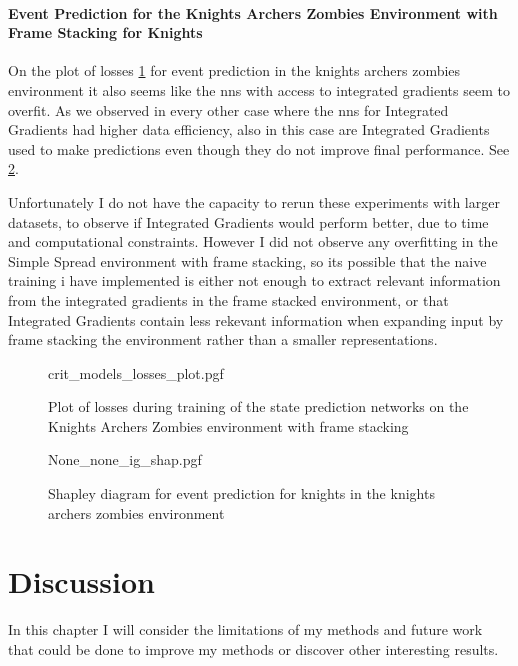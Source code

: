 \documentclass[UKenglish]{uiomasterthesis}
\begin{document}
\subsubsection{Event Prediction for the Knights Archers Zombies Environment with Frame Stacking for Knights}

On the plot of losses \cref{fig:crit_losses_kaz_knight_stack} for event prediction in the knights archers zombies environment it also seems like the \acp{nn} with access to integrated gradients seem to overfit. As we observed in every other case where the \acp{nn} for Integrated Gradients had higher data efficiency, also in this case are Integrated Gradients used to make predictions even though they do not improve final performance. See \cref{fig:crit_kaz_knight_stack}.

Unfortunately I do not have the capacity to rerun these experiments with larger datasets, to observe if Integrated Gradients would perform better, due to time and computational constraints. However I did not observe any overfitting in the Simple Spread environment with frame stacking, so its possible that the naive training i have implemented is either not enough to extract relevant information from the integrated gradients in the frame stacked environment, or that Integrated Gradients contain less rekevant information when expanding input by frame stacking the environment rather than a smaller representations.


\begin{figure}[hbtp]
    \centering
    {crit_models_losses_plot.pgf}
    \caption{Plot of losses during training of the state prediction networks on the Knights Archers Zombies environment with frame stacking}
	\label{fig:crit_losses_kaz_knight_stack}
\end{figure}


\begin{figure}[hbtp]
    \centering
    {None_none_ig_shap.pgf}
    \caption{Shapley diagram for event prediction for knights in the knights archers zombies environment}
    \label{fig:crit_kaz_knight_stack}
\end{figure}

\chapter{Discussion}
\label{chap:disc}
In this chapter I will consider the limitations of my methods and future work that could be done to improve my methods or discover other interesting results.
\end{document}
